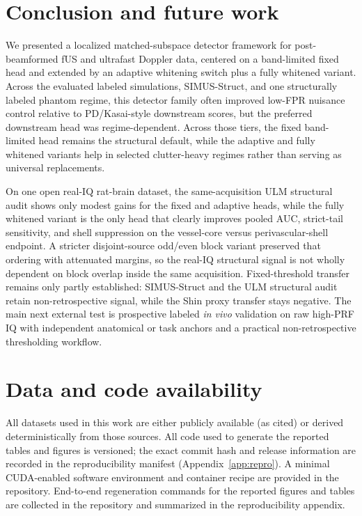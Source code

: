 \documentclass[11pt]{article}
\newif\ifSTAPPAPERONLY
\newcommand{\SuppOrApp}[1]{\ifSTAPPAPERONLY Supplementary Material\else Appendix~\ref{#1}\fi}
\begin{document}
\section{Conclusion and future work}
We presented a localized matched-subspace detector framework for post-beamformed fUS and ultrafast Doppler data, centered on a band-limited fixed head and extended by an adaptive whitening switch plus a fully whitened variant. Across the evaluated labeled simulations, SIMUS-Struct, and one structurally labeled phantom regime, this detector family often improved low-FPR nuisance control relative to PD/Kasai-style downstream scores, but the preferred downstream head was regime-dependent. Across those tiers, the fixed band-limited head remains the structural default, while the adaptive and fully whitened variants help in selected clutter-heavy regimes rather than serving as universal replacements.

On one open real-IQ rat-brain dataset, the same-acquisition ULM structural audit shows only modest gains for the fixed and adaptive heads, while the fully whitened variant is the only head that clearly improves pooled AUC, strict-tail sensitivity, and shell suppression on the vessel-core versus perivascular-shell endpoint. A stricter disjoint-source odd/even block variant preserved that ordering with attenuated margins, so the real-IQ structural signal is not wholly dependent on block overlap inside the same acquisition. Fixed-threshold transfer remains only partly established: SIMUS-Struct and the ULM structural audit retain non-retrospective signal, while the Shin proxy transfer stays negative. The main next external test is prospective labeled \emph{in vivo} validation on raw high-PRF IQ with independent anatomical or task anchors and a practical non-retrospective thresholding workflow.

\section*{Data and code availability}
All datasets used in this work are either publicly available (as cited) or derived deterministically from those sources. All code used to generate the reported tables and figures is versioned; the exact commit hash and release information are recorded in the reproducibility manifest (\SuppOrApp{app:repro}). A minimal CUDA-enabled software environment and container recipe are provided in the repository. End-to-end regeneration commands for the reported figures and tables are collected in the repository and summarized in the reproducibility appendix.
\end{document}
